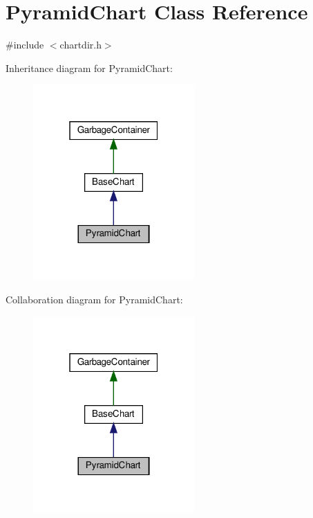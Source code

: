 \hypertarget{class_pyramid_chart}{}\section{Pyramid\+Chart Class Reference}
\label{class_pyramid_chart}


{\ttfamily \#include $<$chartdir.\+h$>$}



Inheritance diagram for Pyramid\+Chart\+:
\nopagebreak
\begin{figure}[H]
\begin{center}
\leavevmode
\includegraphics[width=175pt]{class_pyramid_chart__inherit__graph}
\end{center}
\end{figure}


Collaboration diagram for Pyramid\+Chart\+:
\nopagebreak
\begin{figure}[H]
\begin{center}
\leavevmode
\includegraphics[width=175pt]{class_pyramid_chart__coll__graph}
\end{center}
\end{figure}
